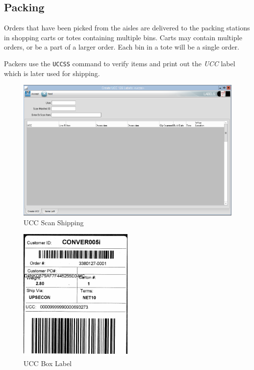 \pagebreak

\subsection{Packing}

Orders that have been picked from the aisles are delivered to the packing stations in shopping carts or totes containing multiple bins.  Carts may contain multiple orders, or be a part of a larger order.  Each bin in a tote will be a single order.


Packers use the \texttt{UCCSS} command to verify items and print out the \emph{UCC} label which is later used for shipping.

\begin{figure}[H]
\includegraphics[width=\textwidth]{../img/image40}
\caption{UCC Scan Shipping}
\end{figure}

\begin{figure}[H]
	\centering
	\includegraphics[width=0.5\textwidth]{../img/image42}
	\caption{UCC Box Label}
\end{figure}

